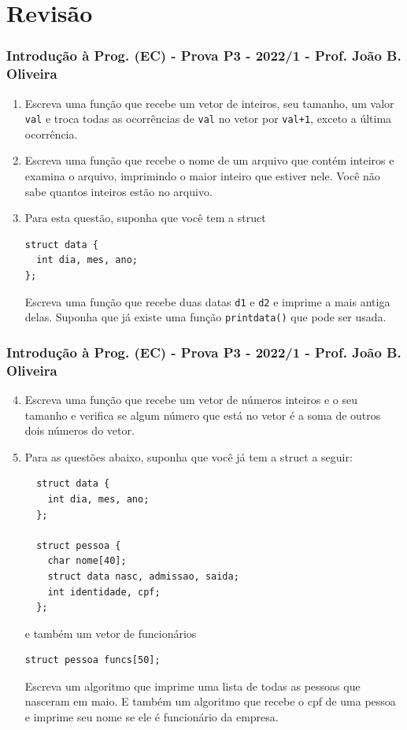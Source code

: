 \documentclass[aspectratio=169]{beamer}
\begin{document}
\section{Revisão}

\begin{frame}[fragile]\frametitle{Introdução à Prog. (EC) - Prova P3 - 2022/1 - Prof. João B. Oliveira}

\begin{enumerate}
	\item Escreva uma função que recebe um vetor de inteiros, seu tamanho, um valor {\tt val} e troca todas as ocorrências de {\tt val} no vetor por {\tt val+1}, exceto a última ocorrência.
	\item Escreva uma função que recebe o nome de um arquivo que contém inteiros e examina o arquivo, imprimindo o maior inteiro que estiver nele. Você não sabe quantos inteiros estão no arquivo.
	\item Para esta questão, suponha que você tem a struct
{\scriptsize
\begin{lstlisting}
struct data {
  int dia, mes, ano;
};
\end{lstlisting}}
Escreva uma função que recebe duas datas {\tt d1} e {\tt d2} e imprime a mais antiga delas. Suponha que já existe uma função {\tt printdata()} que pode ser usada.
\end{enumerate}
\end{frame}

\begin{frame}[fragile]\frametitle{Introdução à Prog. (EC) - Prova P3 - 2022/1 - Prof. João B. Oliveira}
\begin{enumerate}
\setcounter{enumi}{3}
\item Escreva uma função que recebe um vetor de números inteiros e o seu tamanho e verifica se algum número que está no vetor é a soma de outros dois números do vetor. 
 \item Para as questões abaixo, suponha que você já tem a struct a seguir:
{\tiny
\begin{lstlisting}
  struct data {
    int dia, mes, ano;
  };

  struct pessoa {
    char nome[40];
    struct data nasc, admissao, saida;
    int identidade, cpf;
  };
\end{lstlisting}}
e também um vetor de funcionários
{\tiny
\begin{lstlisting}
struct pessoa funcs[50];
\end{lstlisting}}
Escreva um algoritmo que imprime uma lista de todas as pessoas que nasceram em maio. E também um algoritmo que recebe o cpf de uma pessoa e imprime seu nome se ele é funcionário da empresa.
\end{enumerate}
\end{frame}

\end{document}
